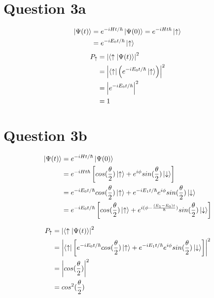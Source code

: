 \documentclass[12pt]{article}
\begin{document}
\newpage
\section*{Question 3a}

\begin{equation}
    \begin{split}
        \ket{\Psi(t)} &= e^{-iHt/\hbar}\ket{\Psi(0)} = e^{-iHt\hbar}\ket{\uparrow} \\
        &= e^{-iE_0t/\hbar}\ket{\uparrow} \\
    \end{split}
\end{equation}
\begin{equation}
    \begin{split}
        P_\uparrow &= \left|\braket{\uparrow|\Psi(t)}\right|^2 \\
        &= \left| \bra{\uparrow} \left(e^{-iE_0t/\hbar}\ket{\uparrow}\right) \right|^2 \\
        &= \left|e^{-iE_0t/\hbar}\right|^2 \\
        &= 1 \\
\end{split}
\end{equation}

\section*{Question 3b}

\begin{equation}
    \begin{split}
        \ket{\Psi(t)} &= e^{-iHt/\hbar}\ket{\Psi(0)} \\
        &= e^{-iHt\hbar}\left[ cos(\frac{\theta}{2})\ket{\uparrow} + e^{i\phi}sin(\frac{\theta}{2})\ket{\downarrow}\right] \\
        &= e^{-iE_0t/\hbar}cos(\frac{\theta}{2})\ket{\uparrow} + e^{-iE_1t/\hbar} e^{i\phi}sin(\frac{\theta}{2})\ket{\downarrow} \\
        &=  e^{-iE_0t/\hbar}\left[cos(\frac{\theta}{2})\ket{\uparrow}+ e^{i(\phi - \frac{(E_1 - E_0)t}{\hbar})}sin(\frac{\theta}{2})\ket{\downarrow}\right]
    \end{split}
\end{equation}

\begin{equation}
    \begin{split}
        P_\uparrow &= \left|\braket{\uparrow|\Psi(t)}\right|^2 \\
        &= \left| \bra{\uparrow}\left[ e^{-iE_0t/\hbar}cos(\frac{\theta}{2})\ket{\uparrow} + e^{-iE_1t/\hbar} e^{i\phi}sin(\frac{\theta}{2})\ket{\downarrow}\right]\right|^2 \\
        &= \left|cos(\frac{\theta}{2})\right|^2 \\
        &= cos^2(\frac{\theta}{2}) \\
\end{split}
\end{equation}
\end{document}
